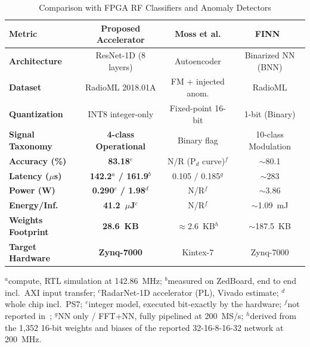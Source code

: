 \documentclass[conference]{IEEEtran}
\begin{document}
\begin{table}[t]
\renewcommand{\arraystretch}{1.15}
\caption{Comparison with FPGA RF Classifiers and Anomaly Detectors}
\label{tab:comparison}
\centering
\scriptsize
\setlength{\tabcolsep}{1pt}
\begin{tabular}{lccc}
\toprule
\textbf{Metric} & \textbf{Proposed Accelerator} & \textbf{Moss et al. \cite{b10}} & \textbf{FINN~\cite{b14}} \\
\midrule
\textbf{Architecture}   & ResNet-1D (8 layers)    & Autoencoder & Binarized NN (BNN) \\
\textbf{Dataset}        & RadioML 2018.01A        & FM + injected anom. & RadioML \\
\textbf{Quantization}   & INT8 integer-only & Fixed-point 16-bit    & 1-bit (Binary) \\
\textbf{Signal Taxonomy}& \textbf{4-class Operational} & Binary flag & 10-class Modulation \\
\textbf{Accuracy (\%)}  & \textbf{83.18$^{e}$} & N/R (P$_d$ curve)$^{f}$ & $\sim$80.1 \\
\textbf{Latency ($\mu$s)} & \textbf{142.2$^{a}$ / 161.9$^{b}$} & 0.105 / 0.185$^{g}$ & $\sim$283 \\
\textbf{Power (W)}      & \textbf{0.290$^{c}$ / 1.98$^{d}$} & N/R$^{f}$ & $\sim$3.86 \\
\textbf{Energy/Inf.}    & \textbf{41.2~$\mu$J$^{c}$}    & N/R$^{f}$ & $\sim$1.09~mJ \\
\textbf{Weights Footprint} & \textbf{28.6~KB}     & $\approx$2.6~KB$^{h}$ & $\sim$187.5~KB \\
\textbf{Target Hardware}& \textbf{Zynq-7000} & Kintex-7 & {Zynq-7000} \\
\bottomrule
\end{tabular}

\vspace{2pt}
\parbox{\columnwidth}{\scriptsize $^{a}$compute, RTL simulation at 142.86~MHz; $^{b}$measured on ZedBoard, end to end incl.\ AXI input transfer; $^{c}$RadarNet-1D accelerator (PL), Vivado estimate; $^{d}$whole chip incl.\ PS7; $^{e}$integer model, executed bit-exactly by the hardware; $^{f}$not reported in~\cite{b10}; $^{g}$NN only / FFT+NN, fully pipelined at 200~MS/s; $^{h}$derived from the 1,352 16-bit weights and biases of the reported 32-16-8-16-32 network at 200~MHz.}
\end{table}
\end{document}
